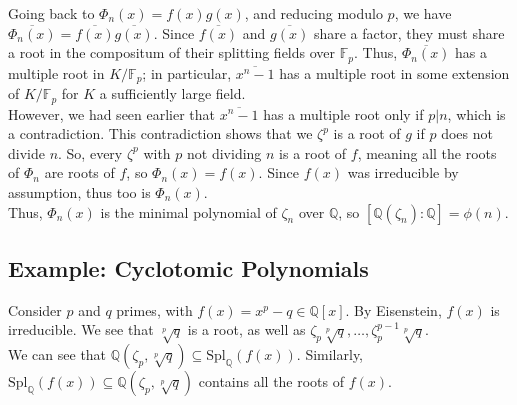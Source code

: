\documentclass[10pt]{extarticle}
\newcommand{\Q}{\mathbb{Q}}
\begin{document}
  Going back to $\Phi_n(x) = f(x)g(x)$, and reducing modulo $p$, we have $\overline{\Phi_n(x)} = \overline{f(x)}\overline{g(x)}$. Since $\overline{f(x)}$ and $\overline{g(x)}$ share a factor, they must share a root in the compositum of their splitting fields over $\mathbb{F}_p$. Thus, $\overline{\Phi_n(x)}$ has a multiple root in $K/\mathbb{F}_p$; in particular, $\overline{x^{n}-1}$ has a multiple root in some extension of $K/\mathbb{F}_p$ for $K$ a sufficiently large field.\\

  However, we had seen earlier that $\overline{x^n-1}$ has a multiple root only if $p|n$, which is a contradiction. This contradiction shows that we $\zeta^{p}$ is a root of $g$ if $p$ does not divide $n$. So, every $\zeta^p$ with $p$ not dividing $n$ is a root of $f$, meaning all the roots of $\Phi_n$ are roots of $f$, so $\Phi_n(x) = f(x)$. Since $f(x)$ was irreducible by assumption, thus too is $\Phi_n(x)$.\\

  Thus, $\Phi_n(x)$ is the minimal polynomial of $\zeta_n$ over $\Q$, so $[\Q(\zeta_n):\Q] = \phi(n)$.
  \subsection{Example: Cyclotomic Polynomials}%
    Consider $p$ and $q$ primes, with $f(x) = x^{p}-q\in \Q[x]$. By Eisenstein, $f(x)$ is irreducible. We see that $\sqrt[p]{q}$ is a root, as well as $\zeta_p\sqrt[p]{q},\dots,\zeta_p^{p-1}\sqrt[p]{q}$.\\

    We can see that $\Q(\zeta_p,\sqrt[p]{q})\subseteq \text{Spl}_{\Q}(f(x))$. Similarly, $\text{Spl}_{\Q}(f(x))\subseteq \Q(\zeta_p,\sqrt[p]{q})$ contains all the roots of $f(x)$.
  \begin{center}
  \end{center}
\end{document}
